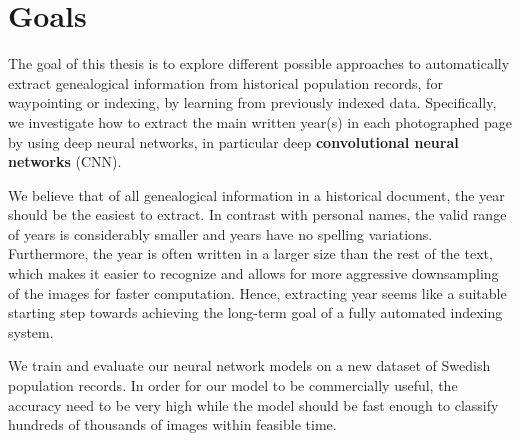 \section{Goals}

The goal of this thesis is to explore different possible approaches to automatically extract genealogical information from historical population records, for waypointing or indexing, by learning from previously indexed data. Specifically, we investigate how to extract the main written year(s) in each photographed page by using deep neural networks, in particular deep \textbf{convolutional neural networks} (CNN).

We believe that of all genealogical information in a historical document, the year should be the easiest to extract.
In contrast with personal names, the valid range of years is considerably smaller and years have no spelling variations. Furthermore, the year is often written in a larger size than the rest of the text, which makes it easier to recognize and allows for more aggressive downsampling of the images for faster computation.
Hence, extracting year seems like a suitable starting step towards achieving the long-term goal of a fully automated indexing system.



We train and evaluate our neural network models on a new dataset of Swedish population records.
In order for our model to be commercially useful, the accuracy need to be very high while the model should be fast enough to classify hundreds of thousands of images within feasible time.


